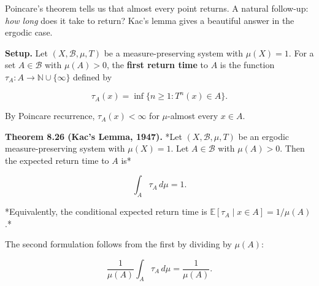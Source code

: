 Poincare's theorem tells us that almost every point returns. A natural follow-up: \textit{how long} does it take to return? Kac's lemma gives a beautiful answer in the ergodic case.

\textbf{Setup.} Let $(X, \mathcal{B}, \mu, T)$ be a measure-preserving system with $\mu(X) = 1$. For a set $A \in \mathcal{B}$ with $\mu(A) > 0$, the \textbf{first return time} to $A$ is the function $\tau_A: A \to \mathbb{N} \cup \{\infty\}$ defined by

\[
\tau_A(x) = \inf\{n \ge 1 : T^n(x) \in A\}.
\]

By Poincare recurrence, $\tau_A(x) < \infty$ for $\mu$-almost every $x \in A$.

\textbf{Theorem 8.26 (Kac's Lemma, 1947).} *Let $(X, \mathcal{B}, \mu, T)$ be an ergodic measure-preserving system with $\mu(X) = 1$. Let $A \in \mathcal{B}$ with $\mu(A) > 0$. Then the expected return time to $A$ is*

\[
\int_A \tau_A \, d\mu = 1.
\]

*Equivalently, the conditional expected return time is $\mathbb{E}[\tau_A \mid x \in A] = 1/\mu(A)$.*

The second formulation follows from the first by dividing by $\mu(A)$:

\[
\frac{1}{\mu(A)}\int_A \tau_A \, d\mu = \frac{1}{\mu(A)}.
\]

